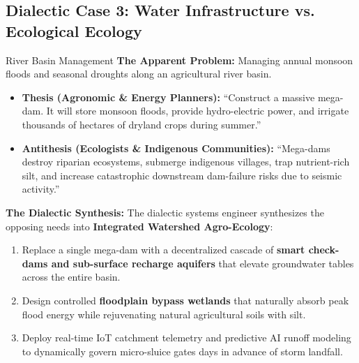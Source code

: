 \subsection{Dialectic Case 3: Water Infrastructure vs. Ecological Ecology}
\begin{dialecticbox}{River Basin Management}
\textbf{The Apparent Problem:} Managing annual monsoon floods and seasonal droughts along an agricultural river basin.

\begin{itemize}[leftmargin=1.5em]
    \item \textbf{Thesis (Agronomic \& Energy Planners):}
    ``Construct a massive mega-dam. It will store monsoon floods, provide hydro-electric power, and irrigate thousands of hectares of dryland crops during summer.''
    \item \textbf{Antithesis (Ecologists \& Indigenous Communities):}
    ``Mega-dams destroy riparian ecosystems, submerge indigenous villages, trap nutrient-rich silt, and increase catastrophic downstream dam-failure risks due to seismic activity.''
\end{itemize}

\textbf{The Dialectic Synthesis:}
The dialectic systems engineer synthesizes the opposing needs into \textbf{Integrated Watershed Agro-Ecology}:
\begin{enumerate}[leftmargin=1.5em]
    \item Replace a single mega-dam with a decentralized cascade of \textbf{smart check-dams and sub-surface recharge aquifers} that elevate groundwater tables across the entire basin.
    \item Design controlled \textbf{floodplain bypass wetlands} that naturally absorb peak flood energy while rejuvenating natural agricultural soils with silt.
    \item Deploy real-time IoT catchment telemetry and predictive AI runoff modeling to dynamically govern micro-sluice gates days in advance of storm landfall.
\end{enumerate}
\end{dialecticbox}

